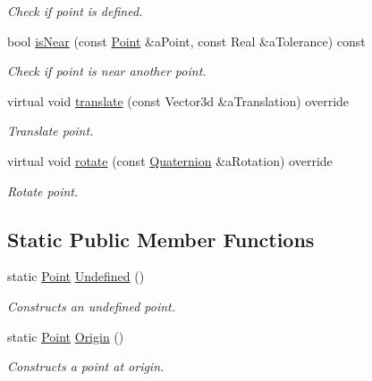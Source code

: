 \begin{DoxyCompactItemize}
\begin{DoxyCompactList}\small\item\em Check if point is defined. \end{DoxyCompactList}\item 
bool \hyperlink{classlibrary_1_1math_1_1geom_1_1d3_1_1objects_1_1_point_a0bcdce172502509f9b9d4e5b3fc75a69}{is\+Near} (const \hyperlink{classlibrary_1_1math_1_1geom_1_1d3_1_1objects_1_1_point}{Point} \&a\+Point, const Real \&a\+Tolerance) const
\begin{DoxyCompactList}\small\item\em Check if point is near another point. \end{DoxyCompactList}\item 
virtual void \hyperlink{classlibrary_1_1math_1_1geom_1_1d3_1_1objects_1_1_point_a7525be2cff259addc949a3aa05a715c7}{translate} (const Vector3d \&a\+Translation) override
\begin{DoxyCompactList}\small\item\em Translate point. \end{DoxyCompactList}\item 
virtual void \hyperlink{classlibrary_1_1math_1_1geom_1_1d3_1_1objects_1_1_point_a4e3c9900e358664fbdfe4d82c7fe40c1}{rotate} (const \hyperlink{classlibrary_1_1math_1_1geom_1_1trf_1_1rot_1_1_quaternion}{Quaternion} \&a\+Rotation) override
\begin{DoxyCompactList}\small\item\em Rotate point. \end{DoxyCompactList}\end{DoxyCompactItemize}
\subsection*{Static Public Member Functions}
\begin{DoxyCompactItemize}
\item 
static \hyperlink{classlibrary_1_1math_1_1geom_1_1d3_1_1objects_1_1_point}{Point} \hyperlink{classlibrary_1_1math_1_1geom_1_1d3_1_1objects_1_1_point_a7c4c9c71f9b29b85925d8a7ed4943501}{Undefined} ()
\begin{DoxyCompactList}\small\item\em Constructs an undefined point. \end{DoxyCompactList}\item 
static \hyperlink{classlibrary_1_1math_1_1geom_1_1d3_1_1objects_1_1_point}{Point} \hyperlink{classlibrary_1_1math_1_1geom_1_1d3_1_1objects_1_1_point_ab2a38e285c562e50bf350272c083986f}{Origin} ()
\begin{DoxyCompactList}\small\item\em Constructs a point at origin. \end{DoxyCompactList}\end{DoxyCompactItemize}

